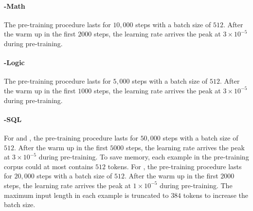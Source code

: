 \paragraph{\ours-Math} The pre-training procedure lasts for $10,000$ steps with a batch size of $512$. After the warm up in the first $2000$ steps, the learning rate arrives the peak at $3{\times}{10}^{-5}$ during pre-training.

\paragraph{\ours-Logic} The pre-training procedure lasts for $5,000$ steps with a batch size of $512$. After the warm up in the first $1000$ steps, the learning rate arrives the peak at $3{\times}{10}^{-5}$ during pre-training.

\paragraph{\ours-SQL} For \oursbart and \oursroberta, the pre-training procedure lasts for $50,000$ steps with a batch size of $512$. After the warm up in the first $5000$ steps, the learning rate arrives the peak at $3{\times}{10}^{-5}$ during pre-training. To save memory, each example in the pre-training corpus could at most contains $512$ tokens.
For \ourstfive, the pre-training procedure lasts for $20,000$ steps with a batch size of $512$. After the warm up in the first $2000$ steps, the learning rate arrives the peak at $1{\times}{10}^{-5}$ during pre-training. The maximum input length in each example is truncated to $384$ tokens to increase the batch size.

